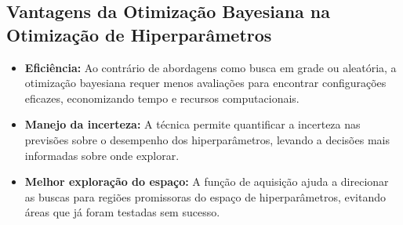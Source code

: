 \documentclass{article}
\begin{document}
\subsection{Vantagens da Otimização Bayesiana na Otimização de Hiperparâmetros}
\begin{itemize}
    \item \textbf{Eficiência:} Ao contrário de abordagens como busca em grade ou aleatória, a otimização bayesiana requer menos avaliações para encontrar configurações eficazes, economizando tempo e recursos computacionais.
    \item \textbf{Manejo da incerteza:} A técnica permite quantificar a incerteza nas previsões sobre o desempenho dos hiperparâmetros, levando a decisões mais informadas sobre onde explorar.
    \item \textbf{Melhor exploração do espaço:} A função de aquisição ajuda a direcionar as buscas para regiões promissoras do espaço de hiperparâmetros, evitando áreas que já foram testadas sem sucesso.
\end{itemize}
\end{document}
